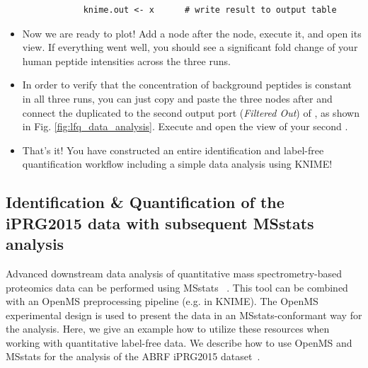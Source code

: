 \begin{itemize}
\begin{lstlisting}
            knime.out <- x      # write result to output table
        \end{lstlisting}
    \item Now we are ready to plot! Add a  node  after the  node, execute it, and open its view. If everything went well, you should see a significant fold change of your human peptide intensities across the three runs.
    \item In order to verify that the concentration of background peptides is constant in all three runs, you can just copy and paste the three nodes after  and connect the duplicated  to the second output port (\textit{Filtered Out}) of , as shown in Fig. \ref{fig:lfq_data_analysis}. Execute and open the view of your second .
    \item That's it! You have constructed an entire identification and label-free quantification workflow including a simple data analysis using KNIME!
\end{itemize}
 


\subsection{Identification \& Quantification of the iPRG2015 data with subsequent MSstats analysis}
Advanced downstream data analysis of quantitative mass spectrometry-based proteomics data can be performed using MSstats ~\cite{Choi2014MSstats}. This tool can be combined with an OpenMS preprocessing pipeline (e.g. in KNIME). The OpenMS experimental design is used to present the data in an MSstats-conformant way for the analysis. Here, we give an example how to utilize these resources when working with quantitative label-free data. We describe how to use OpenMS and MSstats for the analysis of the ABRF iPRG2015 dataset~\cite{Choi2017iPRG}.



